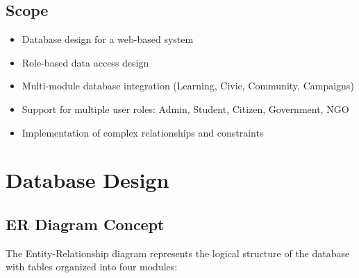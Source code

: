 \documentclass[12pt]{report}
\begin{document}
    \section{Scope}
    \begin{itemize}
        \item Database design for a web-based system
        \item Role-based data access design
        \item Multi-module database integration (Learning, Civic, Community, Campaigns)
        \item Support for multiple user roles: Admin, Student, Citizen, Government, NGO
        \item Implementation of complex relationships and constraints
    \end{itemize}
    
    \chapter{Database Design}
    
    \section{ER Diagram Concept}
    The Entity-Relationship diagram represents the logical structure of the database with tables organized into four modules:
    
\end{document}
